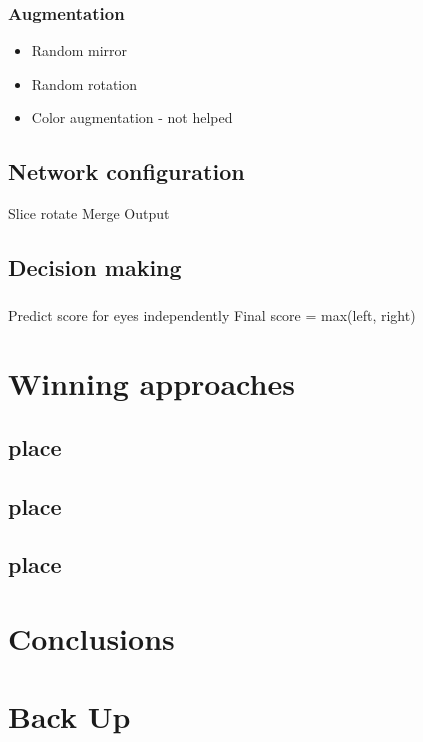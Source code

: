 \documentclass{beamer}
\begin{document}
\begin{frame}\frametitle{Augmentation}
\begin{itemize}
\item Random mirror
\item Random rotation
\item Color augmentation - not helped
\end{itemize}

\end{frame}

\subsection{Network configuration}

Slice rotate
Merge
Output

\subsection{Decision making}

\begin{frame}\frametitle{}
Predict score for eyes independently
Final score = max(left, right)
\end{frame}

\section{Winning approaches} 
\subsection{ place}
\subsection{ place}
\subsection{ place}

\section{Conclusions}

%
%
%

\section{Back Up}
\end{document}
